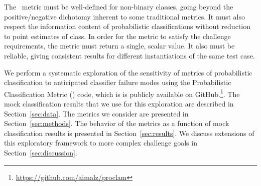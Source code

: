 The \plasticc\ metric must be well-defined for non-binary classes, going beyond the positive/negative dichotomy inherent to some traditional metrics.
It must also respect the information content of probabilistic classifications without reduction to point estimates of class.
In order for the metric to satisfy the challenge requirements, the metric must return a single, scalar value.
It also must be reliable, giving consistent results for different instantiations of the same test case.

We perform a systematic exploration of the sensitivity of metrics of probabilistic classification to anticipated classifier failure modes using the Probabilistic Classification Metric (\proclam) code, which is is publicly available on GitHub.\footnote{\url{https://github.com/aimalz/proclam}}.
The mock classification results that we use for this exploration are described in Section~\ref{sec:data}.
The metrics we consider are presented in Section~\ref{sec:methods}.
The behavior of the metrics as a function of mock classification results is presented in Section~\ref{sec:results}.
We discuss extensions of this exploratory framework to more complex challenge goals in Section~\ref{sec:discussion}.
